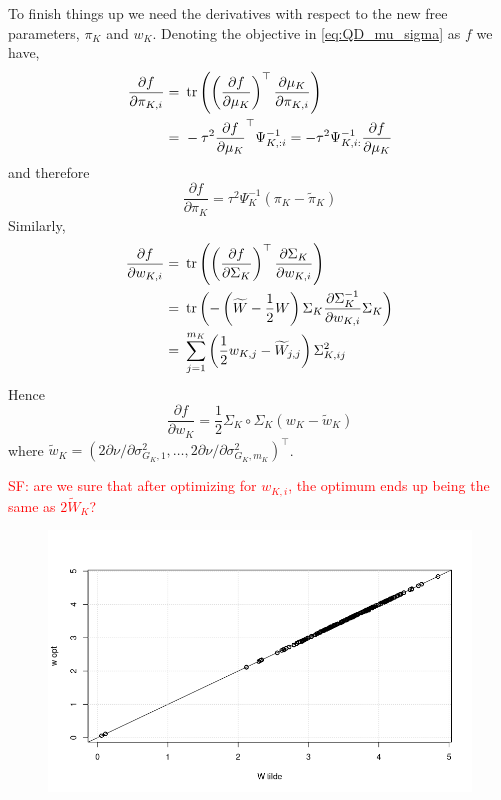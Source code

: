 \documentclass[12pt]{article}
\renewcommand{\red}[1]{\textcolor{red}{#1}}
\begin{document}
To finish things up we need the derivatives with respect to the new free parameters, $\pi_K$ and $w_K$. Denoting the objective in \eqref{eq:QD_mu_sigma} as $f$ we have,
\begin{align*}
    \frac{\partial f}{\partial \pi_{K, i}} 
=&\ \operatorname{tr} \left( \left( \frac{\partial f}{\partial \mu_K} \right)^\top \frac{\partial \mu_K}{\partial \pi_{K, i}} \right) \\
    =&\ - \tau^{2} \frac{\partial f}{\partial \mu_K}^\top \Psi^{-1}_{K,:i}
    = -\tau^{2} \Psi^{-1}_{K, i:} \frac{\partial f}{\partial \mu_K}
\end{align*}
and therefore
\begin{equation} \label{eq:QD_pi_grad} 
    \frac{\partial f}{\partial \pi_{K}} 
    = \tau^{2} \Psi_K^{-1} \left( \pi_K - \widetilde{\pi}_K \right)
\end{equation}
Similarly,
\begin{align*}
    \frac{\partial f}{\partial w_{K, i}} 
=&\ \operatorname{tr} \left( \left( \frac{\partial f}{\partial \Sigma_K} \right)^\top \frac{\partial \Sigma_K}{\partial w_{K,i}} \right) \\
=&\ \operatorname{tr} \left( - \left(\widetilde{W} - \frac{1}{2}W \right) 
\Sigma_K \frac{\partial \Sigma_K^{-1}}{\partial w_{K, i}} \Sigma_K  \right) \\
    =&\ \sum_{j=1}^{m_K} \left(\frac{1}{2}w_{K, j} - \widetilde{W}_{j, j} \right) 
\Sigma_{K, ij}^2
\end{align*}
Hence
\begin{equation} \label{eq:QD_w_grad} 
    \frac{\partial f}{\partial w_{K}} = \frac{1}{2} \Sigma_K \circ \Sigma_K \left(w_K - \widetilde{w}_K \right)
\end{equation}
where $\widetilde{w}_K = \left(2 \partial \nu / \partial \sigma_{G_K, 1}^2, \dots, 2 \partial \nu / \partial \sigma_{G_K, m_K}^2\right)^\top$.

\red{SF: are we sure that after optimizing for $w_{K, i}$, the optimum ends up being the same as $2\tilde{W}_K$?}


\begin{figure}[htp]
    \centering
    \includegraphics[width=\textwidth]{./figures/comp_wopt_Wii.jpg}
\end{figure}
\end{document}
